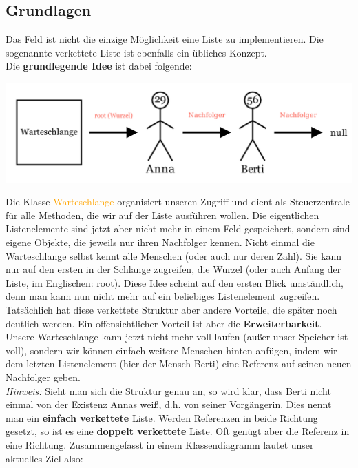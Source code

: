 \documentclass{article}
\begin{document}
\subsection{Grundlagen}
Das Feld ist nicht die einzige Möglichkeit eine Liste zu implementieren. Die sogenannte 
verkettete Liste ist ebenfalls ein übliches Konzept. \\
Die \textbf{\color{red}grundlegende Idee} ist dabei folgende:
\begin{center}
    \includegraphics[scale=0.25]{../../media/linked_idea.png}
\end{center}
Die Klasse \textcolor{orange}{Warteschlange} organisiert unseren Zugriff und dient als Steuerzentrale für alle Methoden, die 
wir auf der Liste ausführen wollen. Die eigentlichen Listenelemente sind jetzt aber nicht mehr in einem 
Feld gespeichert, sondern sind eigene Objekte, die jeweils nur ihren Nachfolger kennen. Nicht einmal die 
Warteschlange selbst kennt alle Menschen (oder auch nur deren Zahl). Sie kann nur auf den ersten in der Schlange
zugreifen, die Wurzel (oder auch Anfang der Liste, im Englischen: root). Diese Idee scheint auf den ersten 
Blick umständlich, denn man kann nun nicht mehr auf ein beliebiges Listenelement zugreifen. \\
Tatsächlich hat diese verkettete Struktur aber andere Vorteile, die später noch deutlich werden. Ein 
offensichtlicher Vorteil ist aber die \textbf{Erweiterbarkeit}. Unsere Warteschlange kann jetzt nicht mehr 
voll laufen (außer unser Speicher ist voll), sondern wir können einfach weitere Menschen hinten anfügen, indem
wir dem letzten Listenelement (hier der Mensch Berti) eine Referenz auf seinen neuen Nachfolger geben. \\
\textit{Hinweis:} Sieht man sich die Struktur genau an, so wird klar, dass Berti nicht einmal von der 
Existenz Annas weiß, d.h. von seiner Vorgängerin. Dies nennt man ein \textbf{einfach verkettete} Liste.
Werden Referenzen in beide Richtung gesetzt, so ist es eine \textbf{doppelt verkettete} Liste. Oft 
genügt aber die Referenz in eine Richtung. 
Zusammengefasst in einem Klassendiagramm lautet unser aktuelles Ziel also: 
\end{document}
